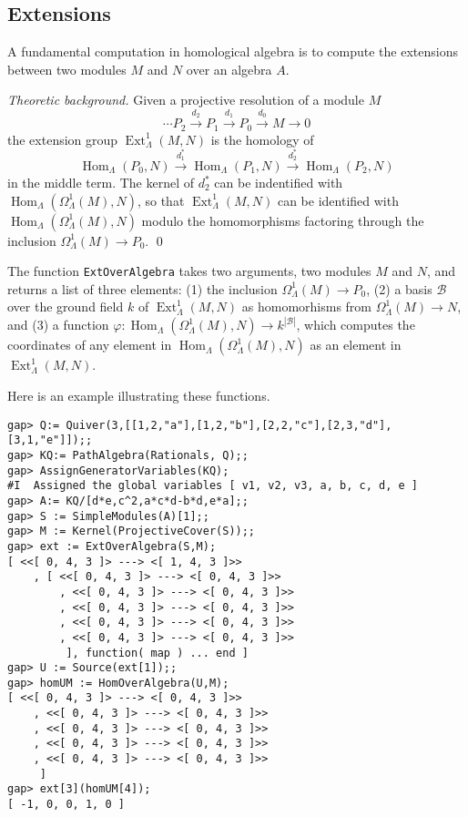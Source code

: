 \documentclass{amsart}
\newcommand{\Hom}{\operatorname{Hom}\nolimits}
\newcommand{\Ext}{\operatorname{Ext}\nolimits}
\theoremstyle{definition}
\newcommand{\code}[1]{\texttt{#1}}
\theoremstyle{theoretic}
\newenvironment{theoback}
{\medskip\footnotesize\textit{Theoretic background.} }
{\qed\par\medskip}
\begin{document}
\subsection{Extensions}
A fundamental computation in homological algebra is to compute the
extensions between two modules $M$ and $N$ over an algebra $A$.

\begin{theoback} 
Given a projective resolution of a module $M$ 
\[\cdots P_2\xrightarrow{d_2} P_1\xrightarrow{d_1}
P_0\xrightarrow{d_0} M\to 0\]
the extension group $\Ext^1_\Lambda(M,N)$ is the homology 
of 
\[\Hom_\Lambda(P_0,N)\xrightarrow{d_1^*} \Hom_\Lambda(P_1,N)
\xrightarrow{d_2^*} \Hom_\Lambda(P_2,N)
\]
in the middle term.  The kernel of $d_2^*$ can be indentified with
$\Hom_\Lambda(\Omega^1_\Lambda(M),N)$, so that $\Ext^1_\Lambda(M,N)$
can be identified with $\Hom_\Lambda(\Omega^1_\Lambda(M),N)$ modulo
the homomorphisms factoring through the inclusion
$\Omega^1_\Lambda(M)\to P_0$.  
\end{theoback}

The function \code{ExtOverAlgebra} takes two arguments, two modules
$M$ and $N$, and returns a list of three elements: (1) the inclusion
$\Omega^1_\Lambda(M)\to P_0$, (2) a basis $\mathcal{B}$ over the
ground field $k$ of $\Ext^1_\Lambda(M,N)$ as homomorhisms from
$\Omega^1_\Lambda(M)\to N$, and (3) a function $\varphi\colon
\Hom_\Lambda(\Omega^1_\Lambda(M),N) \to k^{|\mathcal{B}|}$, which
computes the coordinates of any element in
$\Hom_\Lambda(\Omega^1_\Lambda(M),N)$  as an element in
$\Ext^1_\Lambda(M,N)$. 

Here is an example illustrating these functions.

\begin{verbatim}
gap> Q:= Quiver(3,[[1,2,"a"],[1,2,"b"],[2,2,"c"],[2,3,"d"],
[3,1,"e"]]);;
gap> KQ:= PathAlgebra(Rationals, Q);;
gap> AssignGeneratorVariables(KQ);
#I  Assigned the global variables [ v1, v2, v3, a, b, c, d, e ]
gap> A:= KQ/[d*e,c^2,a*c*d-b*d,e*a];;
gap> S := SimpleModules(A)[1];;
gap> M := Kernel(ProjectiveCover(S));;
gap> ext := ExtOverAlgebra(S,M);
[ <<[ 0, 4, 3 ]> ---> <[ 1, 4, 3 ]>>
    , [ <<[ 0, 4, 3 ]> ---> <[ 0, 4, 3 ]>>
        , <<[ 0, 4, 3 ]> ---> <[ 0, 4, 3 ]>>
        , <<[ 0, 4, 3 ]> ---> <[ 0, 4, 3 ]>>
        , <<[ 0, 4, 3 ]> ---> <[ 0, 4, 3 ]>>
        , <<[ 0, 4, 3 ]> ---> <[ 0, 4, 3 ]>>
         ], function( map ) ... end ]
gap> U := Source(ext[1]);;
gap> homUM := HomOverAlgebra(U,M);
[ <<[ 0, 4, 3 ]> ---> <[ 0, 4, 3 ]>>
    , <<[ 0, 4, 3 ]> ---> <[ 0, 4, 3 ]>>
    , <<[ 0, 4, 3 ]> ---> <[ 0, 4, 3 ]>>
    , <<[ 0, 4, 3 ]> ---> <[ 0, 4, 3 ]>>
    , <<[ 0, 4, 3 ]> ---> <[ 0, 4, 3 ]>>
     ]
gap> ext[3](homUM[4]);
[ -1, 0, 0, 1, 0 ]
\end{verbatim}
\end{document}
